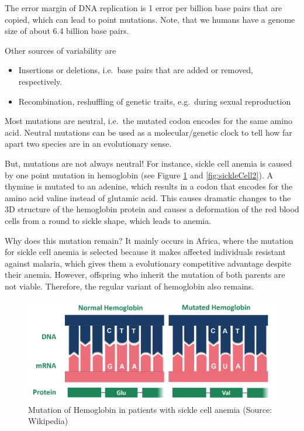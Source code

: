\documentclass[
  11pt,
]{book}
\providecommand{\tightlist}{%
  \setlength{\itemsep}{0pt}\setlength{\parskip}{0pt}}
\begin{document}
The error margin of DNA replication is 1 error per billion base pairs that are copied, which can lead to point mutations. Note, that we humans have a genome size of about 6.4 billion base pairs.

Other sources of variability are

\begin{itemize}
\tightlist
\item
  Insertions or deletions, i.e.~base pairs that are added or removed, respectively.
\item
  Recombination, reshuffling of genetic traits, e.g.~during sexual reproduction
\end{itemize}

Most mutations are neutral, i.e.~the mutated codon encodes for the same amino acid. Neutral mutations can be used as a molecular/genetic clock to tell how far apart two species are in an evolutionary sense.

But, mutations are not always neutral! For instance, sickle cell anemia is caused by one point mutation in hemoglobin (see Figure \ref{fig:sickleCell1} and \ref{fig:sickleCell2}). A thymine is mutated to an adenine, which results in a codon that encodes for the amino acid valine instead of glutamic acid. This causes dramatic changes to the 3D structure of the hemoglobin protein and causes a deformation of the red blood cells from a round to sickle shape, which leads to anemia.

Why does this mutation remain? It mainly occurs in Africa, where the mutation for sickle cell anemia is selected because it makes affected individuals resistant against malaria, which gives them a evolutionary competitive advantage despite their anemia. However, offspring who inherit the mutation of both parents are not viable. Therefore, the regular variant of hemoglobin also remains.

\begin{figure}

{\centering \includegraphics[width=0.45\linewidth]{./figs/sickleCellWikipedia2} 

}

\caption{Mutation of Hemoglobin in patients with sickle cell anemia (Source: Wikipedia)}\label{fig:sickleCell1}
\end{figure}
\end{document}
